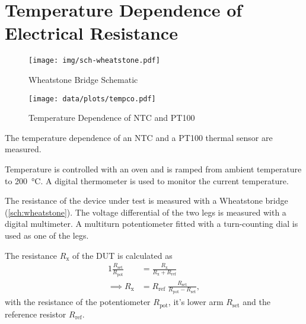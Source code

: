 \chapter{Temperature Dependence of Electrical Resistance}

\begin{figure}
	\centering
	\texttt{[image: img/sch-wheatstone.pdf]}
	\caption{Wheatstone Bridge Schematic}
	\label{sch:wheatstone}
\end{figure}

\begin{figure}
	\centering
	\texttt{[image: data/plots/tempco.pdf]}
	\caption{Temperature Dependence of NTC and PT100}
	\label{plot:tempco}
\end{figure}

The temperature dependence of an NTC and a PT100 thermal sensor are measured.

Temperature is controlled with an oven and is ramped from ambient temperature to \SI{200}{\celsius}.
A digital thermometer is used to monitor the current temperature.

The resistance of the device under test is measured with a Wheatstone bridge (\autoref{sch:wheatstone}).
The voltage differential of the two legs is measured with a digital multimeter.
A multiturn potentiometer fitted with a turn-counting dial is used as one of the legs.

The resistance $R_\text{x}$ of the DUT is calculated as
\begin{alignat}{1}
	\frac{R_\text{set}}{R_\text{pot}} &= \frac{R_\text{x}}{R_\text{x} + R_\text{ref}} \nonumber\\
	\implies R_\text{x} &= R_\text{ref} \; \frac{R_\text{set}}{R_\text{pot} - R_\text{set}},
\end{alignat}
with the resistance of the potentiometer $R_\text{pot}$, it's lower arm $R_\text{set}$ and the reference resistor $R_\text{ref}$.
